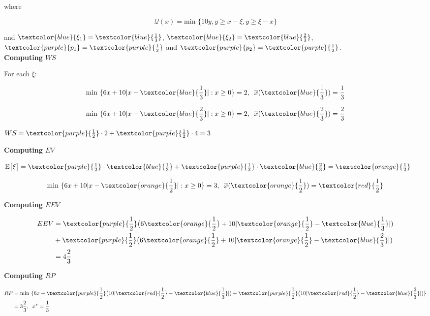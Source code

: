 where

\[
\mathcal{Q}(x) = \textrm{min } \{ 10y, y \geq x-\xi, y \geq \xi-x \}
\]

and $\textcolor{blue}{\xi_1} = \textcolor{blue}{\frac{1}{3}}$, $\textcolor{blue}{\xi_2} = 
\textcolor{blue}{\frac{2}{3}}$, $\textcolor{purple}{p_1} = \textcolor{purple}{\frac{1}{2}}$
and $\textcolor{purple}{p_2} = \textcolor{purple}{\frac{1}{2}}$.\\

\textbf{Computing $WS$}

For each $\xi$:

\[
\textrm{min } \{ 6x + 10|x-\textcolor{blue}{\frac{1}{3}}|: x\geq 0 \} = 2,\;\; 
\overline{x}(\textcolor{blue}{\frac{1}{3}}) = \frac{1}{3}
\]

\[
\textrm{min } \{ 6x + 10|x-\textcolor{blue}{\frac{2}{3}}|: x\geq 0 \} = 2,\;\; 
\overline{x}(\textcolor{blue}{\frac{2}{3}}) = \frac{2}{3}
\]

$WS = \textcolor{purple}{\frac{1}{2}}\cdot 2 + \textcolor{purple}{\frac{1}{2}}\cdot 4 = 3$

\textbf{Computing $EV$}

$\mathbb{E}\big[\xi\big]= \textcolor{purple}{\frac{1}{2}}\cdot \textcolor{blue}{\frac{1}{3}} 
+ \textcolor{purple}{\frac{1}{2}}\cdot \textcolor{blue}{\frac{2}{3}} = \textcolor{orange}{\frac{1}{2}}$

\[
\textrm{min } \{ 6x + 10|x-\textcolor{orange}{\frac{1}{2}}|: x\geq 0 \} = 3,\;\; 
\overline{x}(\textcolor{orange}{\frac{1}{2}}) = \textcolor{red}{\frac{1}{2}}
\]

\textbf{Computing $EEV$}

\begin{alignat*}{2}
EEV & = \textcolor{purple}{\frac{1}{2}}\big(6 \textcolor{orange}{\frac{1}{2}} + 10|\textcolor{orange}{\frac{1}{2}} - \textcolor{blue}{\frac{1}{3}}|) \\
& + \textcolor{purple}{\frac{1}{2}}\big(6 \textcolor{orange}{\frac{1}{2}} + 10|\textcolor{orange}{\frac{1}{2}} - \textcolor{blue}{\frac{2}{3}}|) \\
& = 4\frac{2}{3}
\end{alignat*}

\textbf{Computing $RP$}

\begin{alignat*}{2}
RP & = \textrm{min } \{ 6x + \textcolor{purple}{\frac{1}{2}}\big(10|\textcolor{red}{\frac{1}{2}} - \textcolor{blue}{\frac{1}{3}}|)
+ \textcolor{purple}{\frac{1}{2}}\big(10|\textcolor{red}{\frac{1}{2}} - \textcolor{blue}{\frac{2}{3}}|)\} \\
& = 3\frac{2}{3},\;\; x^* = \frac{1}{3}
\end{alignat*}

